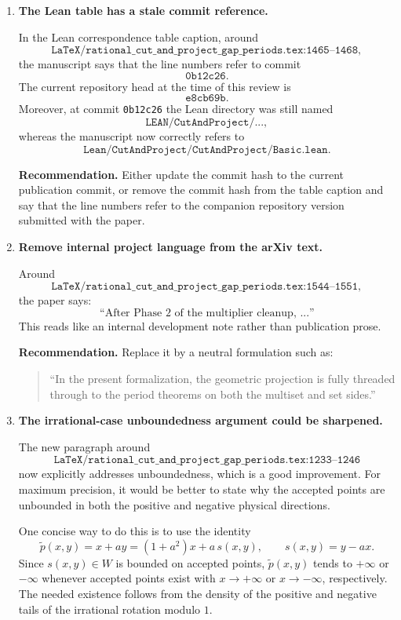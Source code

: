 \documentclass[11pt]{article}
\begin{document}
\begin{enumerate}[label=\textbf{F\arabic*.},leftmargin=*]

\item \textbf{The Lean table has a stale commit reference.}

In the Lean correspondence table caption, around
\[
\texttt{LaTeX/rational\_cut\_and\_project\_gap\_periods.tex:1465--1468},
\]
the manuscript says that the line numbers refer to commit
\[
\texttt{0b12c26}.
\]
The current repository head at the time of this review is
\[
\texttt{e8cb69b}.
\]
Moreover, at commit \texttt{0b12c26} the Lean directory was still named
\[
\texttt{LEAN/CutAndProject/...},
\]
whereas the manuscript now correctly refers to
\[
\texttt{Lean/CutAndProject/CutAndProject/Basic.lean}.
\]

\textbf{Recommendation.}  Either update the commit hash to the current
publication commit, or remove the commit hash from the table caption and say
that the line numbers refer to the companion repository version submitted
with the paper.

\item \textbf{Remove internal project language from the arXiv text.}

Around
\[
\texttt{LaTeX/rational\_cut\_and\_project\_gap\_periods.tex:1544--1551},
\]
the paper says:
\[
\text{``After Phase~2 of the multiplier cleanup, ...''}
\]
This reads like an internal development note rather than publication prose.

\textbf{Recommendation.}  Replace it by a neutral formulation such as:
\begin{quote}
``In the present formalization, the geometric projection is fully threaded
through to the period theorems on both the multiset and set sides.''
\end{quote}

\item \textbf{The irrational-case unboundedness argument could be sharpened.}

The new paragraph around
\[
\texttt{LaTeX/rational\_cut\_and\_project\_gap\_periods.tex:1233--1246}
\]
now explicitly addresses unboundedness, which is a good improvement.  For
maximum precision, it would be better to state why the accepted points are
unbounded in both the positive and negative physical directions.

One concise way to do this is to use the identity
\[
  \tilde p(x,y) = x + a y
  = (1+a^2)x + a\,s(x,y),
  \qquad s(x,y)=y-a x.
\]
Since \(s(x,y)\in W\) is bounded on accepted points, \(\tilde p(x,y)\) tends
to \(+\infty\) or \(-\infty\) whenever accepted points exist with
\(x\to+\infty\) or \(x\to-\infty\), respectively.  The needed existence
follows from the density of the positive and negative tails of the irrational
rotation modulo \(1\).


\end{enumerate}
\end{document}
